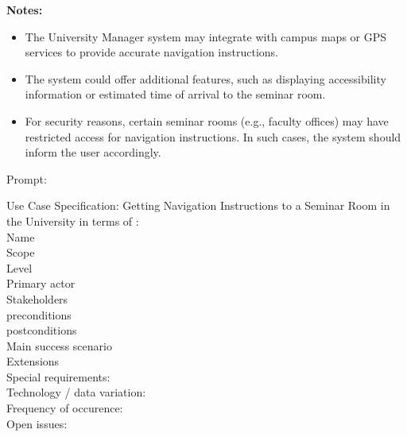 \documentclass[article,onecolumn]{IEEEtran}
\begin{document}
\begin{framed}
	\textbf{Notes:}
	
	\begin{itemize}
		\item The University Manager system may integrate with campus maps or GPS services to provide accurate navigation instructions.
		\item The system could offer additional features, such as displaying accessibility information or estimated time of arrival to the seminar room.
		\item For security reasons, certain seminar rooms (e.g., faculty offices) may have restricted access for navigation instructions. In such cases, the system should inform the user accordingly.
	\end{itemize}
\end{framed}

Prompt:
\begin{framed}
	\small
	Use Case Specification: Getting Navigation Instructions to a Seminar Room in the University in terms of :\\
	Name\\
	Scope\\
	Level\\
	Primary actor \\
	Stakeholders\\
	preconditions\\
	postconditions\\
	Main success scenario\\
	Extensions\\
	Special requirements:\\
	Technology / data variation: \\
	Frequency of occurence: \\
	Open issues:
\end{framed}
\end{document}
